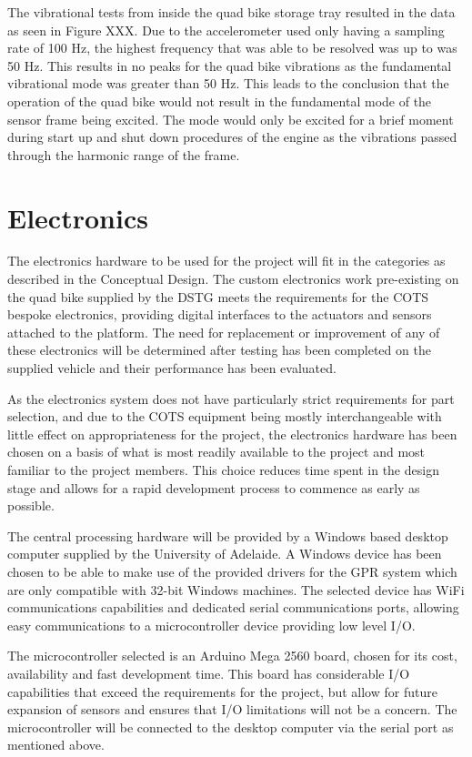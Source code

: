 \documentclass[main.tex]{subfiles}
\begin{document}
The vibrational tests from inside the quad bike storage tray resulted in the data as seen in Figure XXX. Due to the accelerometer used only having a sampling rate of 100 Hz, the highest frequency that was able to be resolved was up to was 50 Hz. This results in no peaks for the quad bike vibrations as the fundamental vibrational mode was greater than 50 Hz. This leads to the conclusion that the operation of the quad bike would not result in the fundamental mode of the sensor frame being excited. The mode would only be excited for a brief moment during start up and shut down procedures of the engine as the vibrations passed through the harmonic range of the frame.

\section{Electronics}
The electronics hardware to be used for the project will fit in the categories as described in the Conceptual Design. The custom electronics work pre-existing on the quad bike supplied by the DSTG meets the requirements for the COTS bespoke electronics, providing digital interfaces to the actuators and sensors attached to the platform. The need for replacement or improvement of any of these electronics will be determined after testing has been completed on the supplied vehicle and their performance has been evaluated.

As the electronics system does not have particularly strict requirements for part selection, and due to the COTS equipment being mostly interchangeable with little effect on appropriateness for the project, the electronics hardware has been chosen on a basis of what is most readily available to the project and most familiar to the project members. This choice reduces time spent in the design stage and allows for a rapid development process to commence as early as possible.

The central processing hardware will be provided by a Windows based desktop computer supplied by the University of Adelaide. A Windows device has been chosen to be able to make use of the provided drivers for the GPR system which are only compatible with 32-bit Windows machines. The selected device has WiFi communications capabilities and dedicated serial communications ports, allowing easy communications to a microcontroller device providing low level I/O.

The microcontroller selected is an Arduino Mega 2560 board, chosen for its cost, availability and fast development time. This board has considerable I/O capabilities that exceed the requirements for the project, but allow for future expansion of sensors and ensures that I/O limitations will not be a concern. The microcontroller will be connected to the desktop computer via the serial port as mentioned above.
\end{document}
